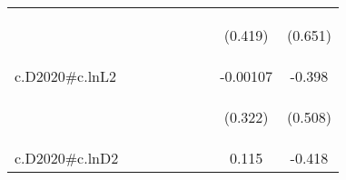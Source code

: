 \documentclass[]{article}
\begin{document}
\begin{center}
\begin{tabular}{lcccccccc}
\vspace{4pt} & \begin{footnotesize}\end{footnotesize} & \begin{footnotesize}\end{footnotesize} & \begin{footnotesize}\end{footnotesize} & \begin{footnotesize}\end{footnotesize} & \begin{footnotesize}\end{footnotesize} & \begin{footnotesize}\end{footnotesize} & \begin{footnotesize}(0.419)\end{footnotesize} & \begin{footnotesize}(0.651)\end{footnotesize} \\
c.D2020\#c.lnL2 &  &  &  &  &  &  & -0.00107 & -0.398 \\
\vspace{4pt} & \begin{footnotesize}\end{footnotesize} & \begin{footnotesize}\end{footnotesize} & \begin{footnotesize}\end{footnotesize} & \begin{footnotesize}\end{footnotesize} & \begin{footnotesize}\end{footnotesize} & \begin{footnotesize}\end{footnotesize} & \begin{footnotesize}(0.322)\end{footnotesize} & \begin{footnotesize}(0.508)\end{footnotesize} \\
c.D2020\#c.lnD2 &  &  &  &  &  &  & 0.115 & -0.418 \\

\end{tabular}
\end{center}
\end{document}
